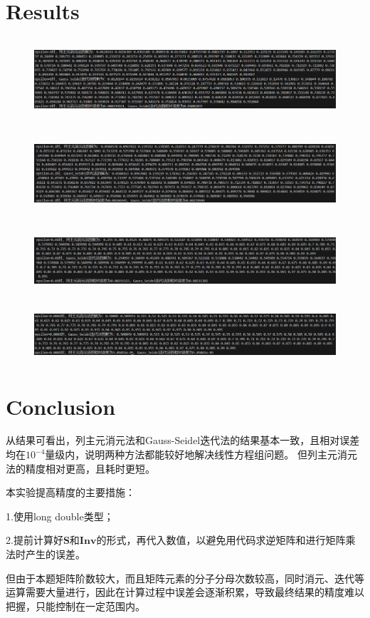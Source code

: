 \documentclass{ctexart}
\begin{document}
\section{Results}

\begin{figure}[H]
	\centering 
	\includegraphics[height=3cm,width=14cm]{1.png}
	\end{figure}
	\begin{figure}[H]
		\centering 
		\includegraphics[height=3cm,width=14cm]{2.png}
		\end{figure}
		\begin{figure}[H]
			\centering 
			\includegraphics[height=2.5cm,width=14cm]{3.png}
			\end{figure}
			\begin{figure}[H]
				\centering 
				\includegraphics[height=2cm,width=14cm]{4.png}
				\end{figure}
	\section{Conclusion}
从结果可看出，列主元消元法和Gauss-Seidel迭代法的结果基本一致，且相对误差均在$10^{-4}$量级内，说明两种方法都能较好地解决线性方程组问题。
但列主元消元法的精度相对更高，且耗时更短。

本实验提高精度的主要措施：

1.使用long double类型；

2.提前计算好$\mathbf{S}$和$\mathbf{Inv}$的形式，再代入数值，以避免用代码求逆矩阵和进行矩阵乘法时产生的误差。


但由于本题矩阵阶数较大，而且矩阵元素的分子分母次数较高，同时消元、迭代等运算需要大量进行，因此在计算过程中误差会逐渐积累，导致最终结果的精度难以把握，只能控制在一定范围内。
\end{document}
